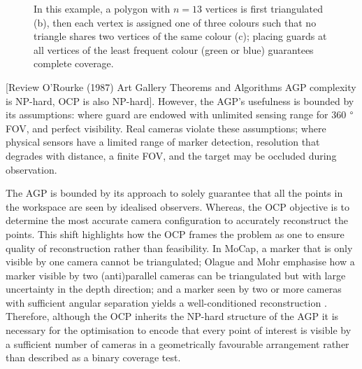 \begin{figure}[h]
    \centering
    \begin{subfigure}[t]{0.45\textwidth}
        \centering
        
        \caption{}
        \label{fig: 2D Polygon}
    \end{subfigure}
    \hfill
    \begin{subfigure}[t]{0.45\textwidth}
        \centering
        
        \caption{}
        \label{fig: Inner triangulation of polygon}
    \end{subfigure}

    \vspace{0.5em}

    \begin{subfigure}[b]{0.6\textwidth}
        \centering
        
        \caption{}
        \label{fig: Vertex tricolouring}
    \end{subfigure}

    \caption[Vertex tricolouring of a 13-vertex polygon.]{In this example, a polygon with $n=13$ vertices is first triangulated (b), then each vertex is assigned one of three colours such that no triangle shares two vertices of the same colour (c); placing guards at all vertices of the least frequent colour (green or blue) guarantees complete coverage.}
    \label{fig: AGP vertex tricolouring}
\end{figure}

[Review O'Rourke (1987) Art Gallery Theorems and Algorithms  AGP complexity is NP-hard, OCP is also NP-hard]. However, the \gls{AGP}'s usefulness is bounded by its assumptions: where guard are endowed with unlimited sensing range for 360 $\degree$ \gls{FOV}, and perfect visibility. Real cameras violate these assumptions; where physical sensors have a limited range of marker detection, resolution that degrades with distance, a finite \gls{FOV}, and the target may be occluded during observation. 

The \gls{AGP} is bounded by its approach to solely guarantee that all the points in the workspace are seen by idealised observers. Whereas, the \gls{OCP} objective is to determine the most accurate camera configuration to accurately reconstruct the points. This shift highlights how the \gls{OCP} frames the problem as one to ensure quality of reconstruction rather than feasibility. In \gls{MoCap}, a marker that is only visible by one camera cannot be triangulated; Olague and Mohr emphasise how a marker visible by two (anti)parallel cameras can be triangulated but with large uncertainty in the depth direction; and a marker seen by two or more cameras with sufficient angular separation yields a well-conditioned reconstruction \parencite{olagueOptimalCameraPlacement2002}. Therefore, although the \gls{OCP} inherits the NP-hard structure of the \gls{AGP} it is necessary for the optimisation to encode that every point of interest is visible by a sufficient number of cameras in a geometrically favourable arrangement rather than described as a binary coverage test.  

